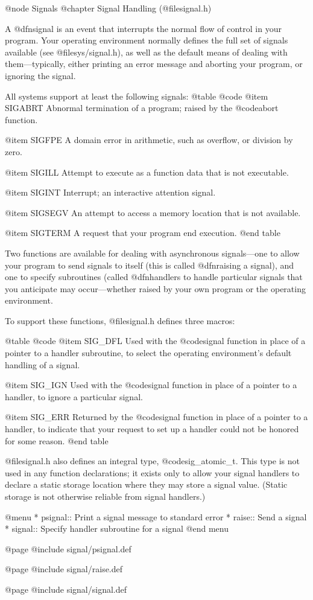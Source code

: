 @node Signals
@chapter Signal Handling (@file{signal.h})

A @dfn{signal} is an event that interrupts the normal flow of control
in your program.  Your operating environment normally defines the full
set of signals available (see @file{sys/signal.h}), as well as the
default means of dealing with them---typically, either printing an
error message and aborting your program, or ignoring the signal.

All systems support at least the following signals:
@table @code
@item SIGABRT
Abnormal termination of a program; raised by the @code{abort} function.

@item SIGFPE
A domain error in arithmetic, such as overflow, or division by zero.

@item SIGILL
Attempt to execute as a function data that is not executable.

@item SIGINT
Interrupt; an interactive attention signal.

@item SIGSEGV
An attempt to access a memory location that is not available.

@item SIGTERM
A request that your program end execution.
@end table

Two functions are available for dealing with asynchronous
signals---one to allow your program to send signals to itself (this is
called @dfn{raising} a signal), and one to specify subroutines (called
@dfn{handlers} to handle particular signals that you anticipate may
occur---whether raised by your own program or the operating environment.

To support these functions, @file{signal.h} defines three macros:

@table @code
@item SIG_DFL
Used with the @code{signal} function in place of a pointer to a
handler subroutine, to select the operating environment's default
handling of a signal.

@item SIG_IGN
Used with the @code{signal} function in place of a pointer to a
handler, to ignore a particular signal.

@item SIG_ERR
Returned by the @code{signal} function in place of a pointer to a
handler, to indicate that your request to set up a handler could not
be honored for some reason.
@end table

@file{signal.h} also defines an integral type, @code{sig_atomic_t}.
This type is not used in any function declarations; it exists only to
allow your signal handlers to declare a static storage location where
they may store a signal value.  (Static storage is not otherwise
reliable from signal handlers.)

@menu
* psignal:: Print a signal message to standard error
* raise::   Send a signal
* signal::  Specify handler subroutine for a signal
@end menu

@page
@include signal/psignal.def

@page
@include signal/raise.def

@page
@include signal/signal.def
